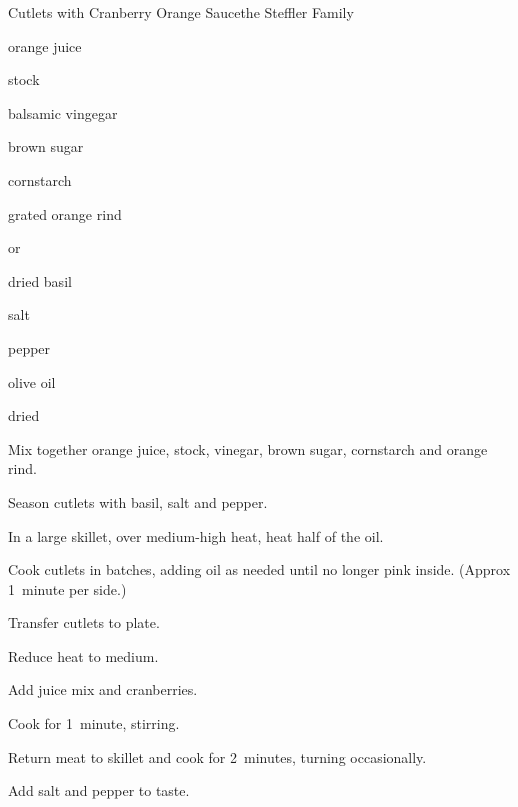\begin{recipe}{Cutlets with Cranberry Orange Sauce}{the Steffler Family}{}

\begin{ingredients}
\item \C{\third} orange juice
\item \C{\third}  stock
\item {} balsamic vingegar
\item {} brown sugar
\item {} cornstarch
\item {} grated orange rind
\item {}  or 
\item {} dried basil
\item \tp{\half} salt
\item \tp{\quarter} pepper
\item {} olive oil
\item \C{\quarter} dried 
\end{ingredients}

\begin{directions}
\item Mix together orange juice, stock, vinegar, brown sugar, cornstarch and orange rind.
\item Season cutlets with basil, salt and pepper.
\item In a large skillet, over medium-high heat, heat half of the oil.
\item Cook cutlets in batches, adding oil as needed until no longer pink inside. (Approx 1~minute per side.)
\item Transfer cutlets to plate.
\item Reduce heat to medium.
\item Add juice mix and cranberries.
\item Cook for 1~minute, stirring.
\item Return meat to skillet and cook for 2~minutes, turning occasionally.
\item Add salt and pepper to taste.
\end{directions}
\end{recipe}
